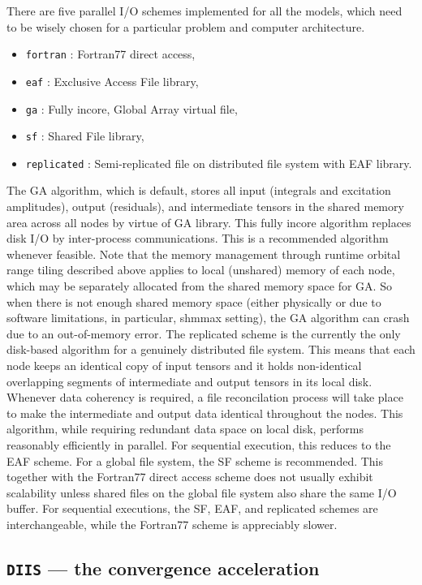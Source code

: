 There are five parallel I/O schemes implemented for all the models, which need to be
wisely chosen for a particular problem and computer architecture. 
\begin{itemize}
\item \verb+fortran+ : Fortran77 direct access,
\item \verb+eaf+ : Exclusive Access File library,
\item \verb+ga+ : Fully incore, Global Array virtual file,
\item \verb+sf+ : Shared File library,
\item \verb+replicated+ : Semi-replicated file on distributed file system with EAF library.
\end{itemize}
The GA algorithm, which is default, stores all input (integrals and
excitation amplitudes), output (residuals), and intermediate tensors in the shared memory area
across all nodes by virtue of GA library.  This fully incore algorithm replaces disk I/O by
inter-process communications.  This is a recommended algorithm whenever feasible.  Note that 
the memory management through runtime orbital range tiling described above applies to local
(unshared) memory of each node, which may be separately allocated from the shared memory space
for GA.  So when there is not enough shared memory space (either physically or due to software
limitations, in particular, shmmax setting), the GA algorithm can crash due to an out-of-memory error.
The replicated scheme is the currently the only disk-based algorithm for a genuinely distributed
file system.  This means that each node keeps an identical copy of input tensors and
it holds non-identical overlapping segments of intermediate and output tensors in its local disk.
Whenever data coherency is required, a file reconcilation process will take place to make the intermediate
and output data identical throughout the nodes.  This algorithm, while requiring redundant data space on
local disk, performs reasonably efficiently in parallel.  For sequential execution, this reduces 
to the EAF scheme.  For a global file system, the SF scheme is recommended.  This together with
the Fortran77 direct access scheme does not usually exhibit scalability unless shared files on
the global file system also share the same I/O buffer.  For sequential executions, the 
SF, EAF, and replicated schemes are interchangeable, while the Fortran77 scheme is appreciably
slower.

\subsection{{\tt DIIS} --- the convergence acceleration}

